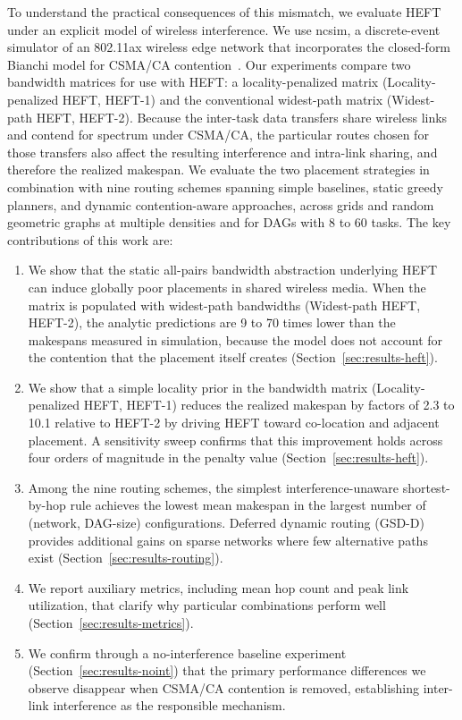 \documentclass[conference]{IEEEtran}
\newcommand{\heftone}{HEFT-1}
\newcommand{\hefttwo}{HEFT-2}
\begin{document}
To understand the practical consequences of this mismatch, we evaluate
HEFT under an explicit model of wireless interference. We use ncsim, a
discrete-event simulator of an 802.11ax wireless edge network that
incorporates the closed-form Bianchi model for CSMA/CA contention~\cite{krishnamachari2026ncsim}.
Our experiments compare two bandwidth matrices for use with HEFT: a
locality-penalized matrix (Locality-penalized HEFT, \heftone{}) and the
conventional widest-path matrix (Widest-path HEFT, \hefttwo{}). Because the
inter-task data transfers share wireless links and contend for spectrum
under CSMA/CA, the particular routes chosen for those transfers also affect
the resulting interference and intra-link sharing, and therefore the
realized makespan. We evaluate the two placement strategies in combination
with nine routing schemes spanning simple baselines, static greedy
planners, and dynamic contention-aware approaches, across grids and random
geometric graphs at multiple densities and for DAGs with 8 to 60 tasks.
The key contributions of this work are:

\begin{enumerate}
\item We show that the static all-pairs bandwidth abstraction underlying
HEFT can induce globally poor placements in shared wireless media. When
the matrix is populated with widest-path bandwidths (Widest-path HEFT,
\hefttwo{}), the analytic predictions are 9 to 70 times lower than the
makespans measured in simulation, because the model does not account for
the contention that the placement itself creates
(Section~\ref{sec:results-heft}).

\item We show that a simple locality prior in the bandwidth matrix
(Locality-penalized HEFT, \heftone{}) reduces the realized makespan by
factors of 2.3 to 10.1 relative to \hefttwo{} by driving HEFT toward
co-location and adjacent placement. A sensitivity sweep confirms that this
improvement holds across four orders of magnitude in the penalty value
(Section~\ref{sec:results-heft}).

\item Among the nine routing schemes, the simplest interference-unaware
shortest-by-hop rule achieves the lowest mean makespan in the largest number
of (network, DAG-size) configurations. Deferred dynamic routing (GSD-D)
provides additional gains on sparse networks where few alternative paths
exist (Section~\ref{sec:results-routing}).

\item We report auxiliary metrics, including mean hop count and peak link
utilization, that clarify why particular combinations perform well
(Section~\ref{sec:results-metrics}).

\item We confirm through a no-interference baseline experiment
(Section~\ref{sec:results-noint}) that the primary performance differences
we observe disappear when CSMA/CA contention is removed, establishing
inter-link interference as the responsible mechanism.
\end{enumerate}
\end{document}
